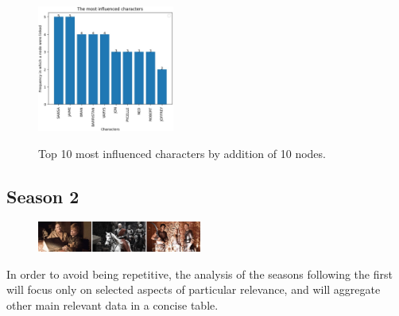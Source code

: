 \documentclass[10pt,twocolumn,letterpaper]{article}
\begin{document}
\begin{figure}[!h]
    \centering
    \includegraphics[width=0.4\textwidth]{img/s1/link_pred_chart.jpg}
    \vspace{0.2cm}\\
    \caption{\small{Top 10 most influenced characters by addition of 10 nodes.}}
\end{figure}


\subsection{Season 2}

\begin{figure}[!h]
    \includegraphics[width=0.48\textwidth]{img/s2/frames_s2.jpg}
\end{figure}

In order to avoid being repetitive, the analysis of the seasons following the first will focus only on selected aspects of particular relevance, and will aggregate other main relevant data in a concise table.

\begin{center}
    \vspace{5cm}
\end{center}
\end{document}
